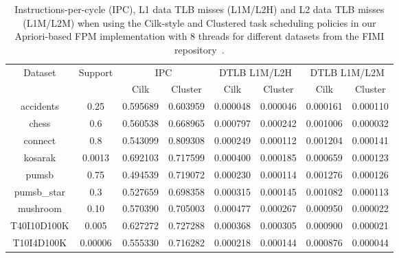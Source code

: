 \documentclass{IOS-Book-Article}
\begin{document}
\begin{table}[t]
\centering
\begin{tabular}{|c|c|c|c|c|c|c|c|}  \hline

\multirow{2}{*}{Dataset} & 
\multirow{2}{*}{Support} & 
\multicolumn{2}{|c|}{IPC} &
\multicolumn{2}{|c|}{DTLB L1M/L2H} &
\multicolumn{2}{|c|}{DTLB L1M/L2M} \\ \cline{3-8}
& & Cilk & Cluster & 
Cilk & Cluster & 
Cilk & Cluster \\ 
\hline
accidents & 0.25 &  0.595689 & 0.603959 &
0.000048 & 0.000046 & 0.000161 & 0.000110\\ \hline
chess & 0.6 & 0.560538 & 0.668965 & 
0.000797 & 0.000242 & 0.001006 & 0.000032\\ \hline
connect & 0.8 & 0.543099 & 0.809308 & 
0.000249 & 0.000112 & 0.001204 & 0.000141\\ \hline
kosarak & 0.0013 & 0.692103 & 0.717599 & 
0.000400 & 0.000185 & 0.000659 & 0.000123\\ \hline
pumsb & 0.75 & 0.494539 & 0.719072 & 
0.000230 & 0.000114 & 0.001276 & 0.000126\\ \hline
pumsb\_star & 0.3 & 0.527659 & 0.698358 & 
0.000315 & 0.000145 & 0.001082 & 0.000113\\ \hline
mushroom & 0.10 & 0.570390 & 0.705003 & 
0.000477 &  0.000267 & 0.000950 &0.000022\\ \hline
T40I10D100K & 0.005 & 0.627272 & 0.727288 &
0.000368 & 0.000305 & 0.000900 & 0.000021\\ \hline
T10I4D100K & 0.00006 & 0.555330 & 0.716282 &
0.000218 & 0.000144 & 0.000876 & 0.000044 \\ \hline
\end{tabular}
\vspace{+5pt}
\caption{Instructions-per-cycle (IPC), L1 data TLB misses (L1M/L2H) and L2 data
TLB misses (L1M/L2M) when using the Cilk-style and Clustered task scheduling
policies in our Apriori-based FPM implementation with 8 threads for different
datasets from the FIMI repository~\cite{bart:2004}.}
\label{tbl:fim8}
\end{table}
\end{document}
